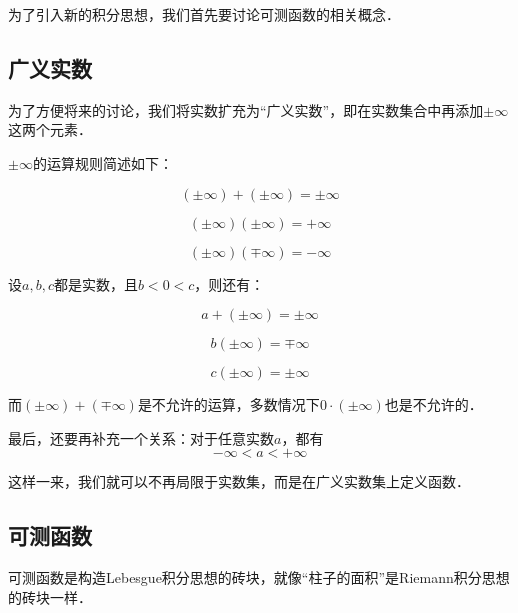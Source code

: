 
为了引入新的积分思想，我们首先要讨论可测函数的相关概念．

\subsection{广义实数}

为了方便将来的讨论，我们将实数扩充为“广义实数”，即在实数集合中再添加$\pm\infty$这两个元素．

$\pm\infty$的运算规则简述如下：

\begin{equation}
(\pm\infty)+( \pm \infty)=\pm \infty
\end{equation}

\begin{equation}
(\pm\infty)(\pm\infty)=+\infty
\end{equation}

\begin{equation}
(\pm\infty)(\mp\infty)=-\infty
\end{equation}

设$a, b, c$都是实数，且$b<0<c$，则还有：

\begin{equation}
a+(\pm\infty)=\pm\infty
\end{equation}

\begin{equation}
b(\pm\infty)=\mp\infty
\end{equation}

\begin{equation}
c(\pm\infty)=\pm\infty
\end{equation}

而$(\pm\infty)+(\mp\infty)$是不允许的运算，多数情况下$0\cdot(\pm\infty)$也是不允许的．

最后，还要再补充一个关系：对于任意实数$a$，都有
\begin{equation}
-\infty<a<+\infty
\end{equation}


这样一来，我们就可以不再局限于实数集，而是在广义实数集上定义函数．



\subsection{可测函数}

可测函数是构造Lebesgue积分思想的砖块，就像“柱子的面积”是Riemann积分思想的砖块一样．

